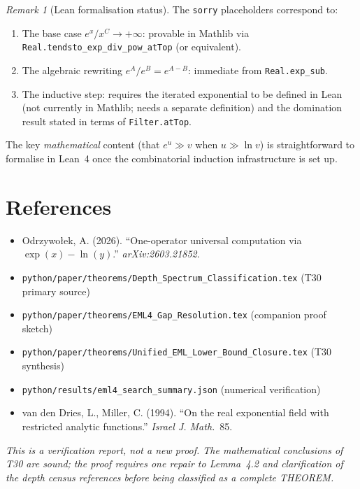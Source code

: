 \documentclass[12pt,a4paper]{article}
\theoremstyle{definition}
\theoremstyle{remark}
\newtheorem{remark}[theorem]{Remark}
\begin{document}
\begin{remark}[Lean formalisation status]
The \texttt{sorry} placeholders correspond to:
\begin{enumerate}
  \item The base case $e^x/x^C\to+\infty$: provable in Mathlib via
        \texttt{Real.tendsto\_exp\_div\_pow\_atTop} (or equivalent).
  \item The algebraic rewriting $e^A/e^B=e^{A-B}$: immediate from
        \texttt{Real.exp\_sub}.
  \item The inductive step: requires the iterated exponential to be defined in
        Lean (not currently in Mathlib; needs a separate definition) and the
        domination result stated in terms of \texttt{Filter.atTop}.
\end{enumerate}
The key \emph{mathematical} content (that $e^u\gg v$ when $u\gg\ln v$)
is straightforward to formalise in Lean~4 once the combinatorial induction
infrastructure is set up.
\end{remark}

\section*{References}

\begin{itemize}
  \item Odrzywołek, A. (2026). ``One-operator universal computation via
        $\exp(x)-\ln(y)$.'' \textit{arXiv:2603.21852}.
  \item \texttt{python/paper/theorems/Depth\_Spectrum\_Classification.tex}
        (T30 primary source)
  \item \texttt{python/paper/theorems/EML4\_Gap\_Resolution.tex}
        (companion proof sketch)
  \item \texttt{python/paper/theorems/Unified\_EML\_Lower\_Bound\_Closure.tex}
        (T30 synthesis)
  \item \texttt{python/results/eml4\_search\_summary.json}
        (numerical verification)
  \item van den Dries, L., Miller, C. (1994). ``On the real exponential field
        with restricted analytic functions.'' \textit{Israel J. Math.}~85.
\end{itemize}

\bigskip
\noindent\textit{This is a verification report, not a new proof.
The mathematical conclusions of T30 are sound; the proof requires one
repair to Lemma~4.2 and clarification of the depth census references
before being classified as a complete THEOREM.}
\end{document}
